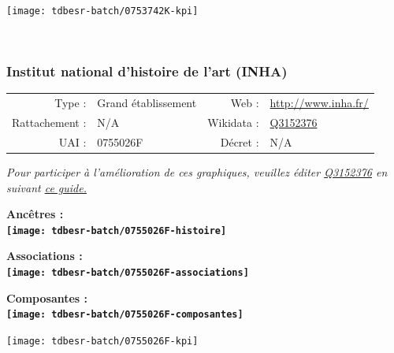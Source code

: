 \documentclass[12pt,french,]{article}
\begin{document}
\begin{center}\texttt{[image: tdbesr-batch/0753742K-kpi]} \end{center}\checkoddpage

\ifoddpage ~\newpage \fi   

\hypertarget{institut-national-dhistoire-de-lart-inha}{%
\subsubsection{Institut national d'histoire de l'art
(INHA)}\label{institut-national-dhistoire-de-lart-inha}}

\begin{tabular*}{\textwidth}{rp{5cm}rl}  
\hline  
Type : & Grand établissement & Web : &\href{http://www.inha.fr/}{http://www.inha.fr/} \\  
Rattachement : & N/A & Wikidata : & \href{https://www.wikidata.org/entity/Q3152376}{Q3152376} \\  
UAI : & 0755026F & Décret : & N/A \\  
\hline  
\end{tabular*}

\textit{\scriptsize Pour participer à l'amélioration de ces graphiques, veuillez éditer  \href{https://www.wikidata.org/entity/Q3152376}{Q3152376}  en suivant \href{https://github.com/cpesr/wikidataESR/blob/master/Rmd/wikidataESR.md}{ce guide.}}

\vspace{1cm}  
\begin{minipage}[b]{0.50\textwidth}\begin{center} \bf Ancêtres : \\  
\texttt{[image: tdbesr-batch/0755026F-histoire]} \end{center}\end{minipage}\begin{minipage}[b]{0.50\textwidth}\begin{center} \bf Associations : \\  
\texttt{[image: tdbesr-batch/0755026F-associations]} \end{center}\end{minipage}

\hrulefill

\begin{center} \bf Composantes : \\  
\texttt{[image: tdbesr-batch/0755026F-composantes]} \end{center}

\begin{center}\texttt{[image: tdbesr-batch/0755026F-kpi]} \end{center}\checkoddpage
\end{document}
